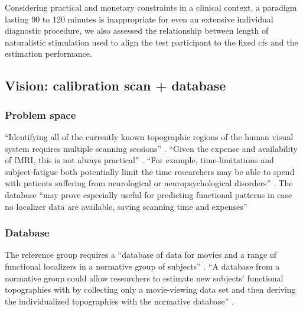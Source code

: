 Considering practical and monetary constraints in a clinical context, a paradigm
lasting 90 to 120 minutes is inappropriate for even an extensive individual
diagnostic procedure, we also assessed the relationship between length of
naturalistic stimulation used to align the test participant to the fixed
\ac{cfs} and the estimation performance.



\subsection{Vision: calibration scan + database}





\subsubsection{Problem space}

``Identifying all of the currently known topographic regions of the human visual
system requires multiple scanning sessions'' \citep{wang2015probabilistic}.
%
``Given the expense and availability of fMRI, this is not always practical''
\citep{wang2015probabilistic}.
%
``For example, time-limitations and subject-fatigue both potentially limit the
time researchers may be able to spend with patients suffering from neurological
or neuropsychological disorders'' \citep{wang2015probabilistic}.
%
The database ``may prove especially useful for predicting functional patterns in
case no localizer data are available, saving scanning time and expenses''
\citep{rosenke2021probabilistic}


\subsubsection{Database}
%
The reference group requires a ``database of data for movies and a range of
functional localizers in a normative group of subjects''
\citep{jiahui2020predicting}.
%
``A database from a normative group could allow researchers to estimate new
subjects' functional topographies with by collecting only a movie-viewing data
set and then deriving the individualized topographies with the normative
database'' \citep{jiahui2020predicting}.

